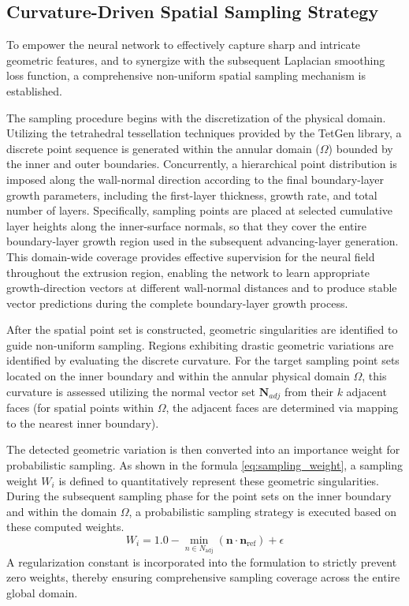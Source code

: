 \documentclass[%
 aip,
 amsmath,amssymb,
 reprint,%
nobibnotes,
]{revtex4-1}
\begin{document}
\subsection{\label{sec:level1-3}Curvature-Driven Spatial Sampling Strategy}
To empower the neural network to effectively capture sharp and intricate geometric features, and to synergize with the subsequent Laplacian smoothing loss function, a comprehensive non-uniform spatial sampling mechanism is established.
    
    The sampling procedure begins with the discretization of the physical domain.
    Utilizing the tetrahedral tessellation techniques provided by the TetGen library, a discrete point sequence is generated within the annular domain ($\Omega$) bounded by the inner and outer boundaries. Concurrently, a hierarchical point distribution is imposed along the wall-normal direction according to the final boundary-layer growth parameters, including the first-layer thickness, growth rate, and total number of layers. Specifically, sampling points are placed at selected cumulative layer heights along the inner-surface normals, so that they cover the entire boundary-layer growth region used in the subsequent advancing-layer generation. This domain-wide coverage provides effective supervision for the neural field throughout the extrusion region, enabling the network to learn appropriate growth-direction vectors at different wall-normal distances and to produce stable vector predictions during the complete boundary-layer growth process.
    
    After the spatial point set is constructed, geometric singularities are identified to guide non-uniform sampling.
    Regions exhibiting drastic geometric variations are identified by evaluating the discrete curvature. For the target sampling point sets located on the inner boundary and within the annular physical domain $\Omega$, this curvature is assessed utilizing the normal vector set $\mathbf{N}_{adj}$ from their $k$ adjacent faces (for spatial points within $\Omega$, the adjacent faces are determined via mapping to the nearest inner boundary).
    
    The detected geometric variation is then converted into an importance weight for probabilistic sampling.
    As shown in the formula \ref{eq:sampling_weight}, a sampling weight $W_i$ is defined to quantitatively represent these geometric singularities. During the subsequent sampling phase for the point sets on the inner boundary and within the domain $\Omega$, a probabilistic sampling strategy is executed based on these computed weights.
    \begin{equation}
        W_i = 1.0 - \min_{n \in N_{\text{adj}}} (\mathbf{n} \cdot \mathbf{n}_{\text{ref}}) + \epsilon
    \label{eq:sampling_weight}
    \end{equation}
    A regularization constant is incorporated into the formulation to strictly prevent zero weights, thereby ensuring comprehensive sampling coverage across the entire global domain.
\end{document}
